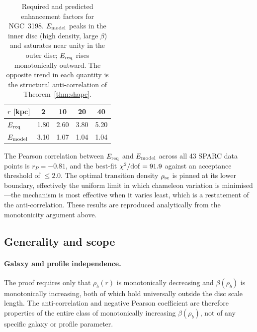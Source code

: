 \documentclass[12pt,a4paper]{article}
\theoremstyle{plain}
\newcommand{\rsc}{\rho_{\rm sc}}
\newcommand{\rhob}{\rho_b}
\begin{document}
\begin{table}[h]
  \centering
  \begin{tabular}{lcccc}
    \toprule
    $r$ [kpc] & 2 & 10 & 20 & 40 \\
    \midrule
    $E_{\rm req}$   & 1.80 & 2.60 & 3.80 & 5.20 \\
    $E_{\rm model}$ & 3.10 & 1.07 & 1.04 & 1.04 \\
    \bottomrule
  \end{tabular}
  \caption{Required and predicted enhancement factors for NGC~3198.
    $E_{\rm model}$ peaks in the inner disc (high density, large $\beta$)
    and saturates near unity in the outer disc; $E_{\rm req}$ rises
    monotonically outward.  The opposite trend in each quantity is the
    structural anti-correlation of Theorem~\ref{thm:shape}.}
  \label{tab:shape}
\end{table}

The Pearson correlation between $E_{\rm req}$ and $E_{\rm model}$ across
all 43 SPARC data points is $r_P = -0.81$, and the best-fit
$\chi^2/{\rm dof} = 91.9$ against an acceptance threshold of $\leq 2.0$.
The optimal transition density $\rsc$ is pinned at its lower boundary,
effectively the uniform limit in which chameleon variation is minimised---the
mechanism is most effective when it varies least, which is a restatement of
the anti-correlation.  These results are reproduced analytically from the
monotonicity argument above.

\subsection{Generality and scope}
\label{sec:shape_gen}

\paragraph{Galaxy and profile independence.}
The proof requires only that $\rhob(r)$ is monotonically decreasing and
$\beta(\rhob)$ is monotonically increasing, both of which hold universally
outside the disc scale length.  The anti-correlation and negative Pearson
coefficient are therefore properties of the entire class of monotonically
increasing $\beta(\rhob)$, not of any specific galaxy or profile parameter.
\end{document}
